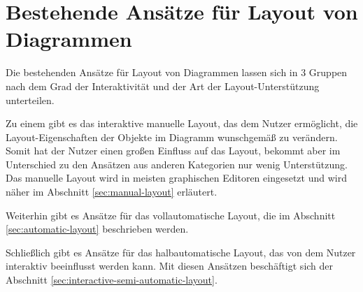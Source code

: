 
\chapter{Bestehende Ansätze für Layout von Diagrammen}

Die bestehenden Ansätze für Layout von Diagrammen lassen sich in 3 Gruppen nach dem Grad der Interaktivität und der Art der Layout-Unterstützung unterteilen.

Zu einem gibt es das interaktive manuelle Layout, das dem Nutzer ermöglicht, die Layout-Eigenschaften der Objekte im Diagramm wunschgemäß zu verändern. Somit hat der Nutzer einen großen Einfluss auf das Layout, bekommt aber im Unterschied zu den Ansätzen aus anderen Kategorien nur wenig Unterstützung. Das manuelle Layout wird in meisten graphischen Editoren eingesetzt und wird näher im Abschnitt \ref{sec:manual-layout} erläutert.

Weiterhin gibt es Ansätze für das vollautomatische Layout, die im Abschnitt \ref{sec:automatic-layout} beschrieben werden.

Schließlich gibt es Ansätze für das halbautomatische Layout, das von dem Nutzer interaktiv beeinflusst werden kann. Mit diesen Ansätzen beschäftigt sich der Abschnitt \ref{sec:interactive-semi-automatic-layout}.





